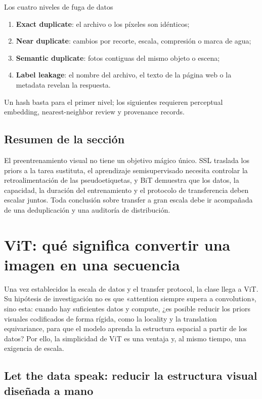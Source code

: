 \documentclass[a4paper]{article}
\begin{document}
\begin{warningbox}{Los cuatro niveles de fuga de datos}
\begin{enumerate}
  \item \textbf{Exact duplicate}: el archivo o los píxeles son idénticos;
  \item \textbf{Near duplicate}: cambios por recorte, escala, compresión o marca de agua;
  \item \textbf{Semantic duplicate}: fotos contiguas del mismo objeto o escena;
  \item \textbf{Label leakage}: el nombre del archivo, el texto de la página web o la metadata revelan la respuesta.
\end{enumerate}
Un hash basta para el primer nivel; los siguientes requieren perceptual embedding, nearest-neighbor review y provenance records.
\end{warningbox}

\subsection{Resumen de la sección}

El preentrenamiento visual no tiene un objetivo mágico único. SSL traslada los priors a la tarea sustituta, el aprendizaje semisupervisado necesita controlar la retroalimentación de las pseudoetiquetas, y BiT demuestra que los datos, la capacidad, la duración del entrenamiento y el protocolo de transferencia deben escalar juntos. Toda conclusión sobre transfer a gran escala debe ir acompañada de una deduplicación y una auditoría de distribución.
\section{ViT: qué significa convertir una imagen en una secuencia}

Una vez establecidos la escala de datos y el transfer protocol, la clase llega a ViT. Su hipótesis de investigación no es que «attention siempre supera a convolution», sino esta: cuando hay suficientes datos y compute, ¿es posible reducir los priors visuales codificados de forma rígida, como la locality y la translation equivariance, para que el modelo aprenda la estructura espacial a partir de los datos? Por ello, la simplicidad de ViT es una ventaja y, al mismo tiempo, una exigencia de escala.

\subsection{Let the data speak: reducir la estructura visual diseñada a mano}
\end{document}
